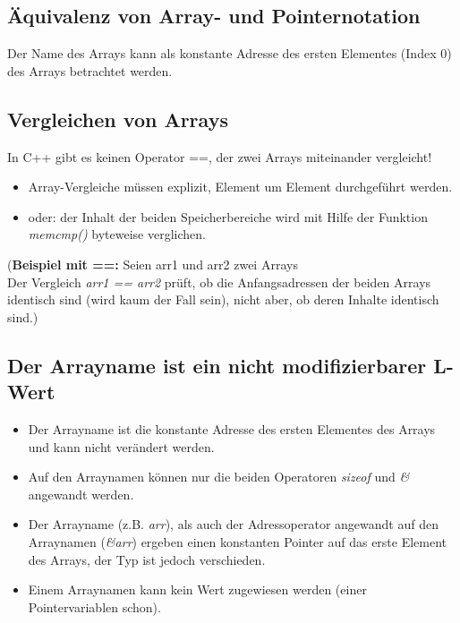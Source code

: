 \subsection{Äquivalenz von Array- und Pointernotation}
\begin{minipage}{0.3\linewidth}
Der Name des Arrays kann als konstante Adresse des ersten Elementes (Index 0) des Arrays betrachtet werden.
\end{minipage}%
\hspace{0.01\linewidth}
\begin{minipage}{0.65\linewidth}
	
\end{minipage}

\subsection{Vergleichen von Arrays}
\begin{hinweis}
In C++ gibt es keinen Operator ==, der zwei Arrays miteinander vergleicht!
\end{hinweis}
\begin{itemize}
	\item Array-Vergleiche müssen explizit, Element um Element durchgeführt werden.
	\item oder: der Inhalt der beiden Speicherbereiche wird mit Hilfe der Funktion \emph{memcmp()} byteweise verglichen.
\end{itemize}
\vspace{\baselineskip}
(\textbf{Beispiel mit ==:} Seien arr1 und arr2 zwei Arrays\\Der Vergleich \emph{arr1 == arr2} prüft, ob die Anfangsadressen der beiden Arrays identisch sind (wird kaum der Fall sein), nicht aber, ob deren Inhalte identisch sind.)
	
\subsection{Der Arrayname ist ein nicht modifizierbarer L-Wert}
\begin{itemize}
	\item Der Arrayname ist die konstante Adresse des ersten Elementes des Arrays und kann nicht verändert werden.
	\item Auf den Arraynamen können nur die beiden Operatoren \emph{sizeof} und \emph{\&} angewandt werden.
	\item Der Arrayname (z.B. \emph{arr}), als auch der Adressoperator angewandt auf den Arraynamen (\emph{\&arr}) ergeben einen konstanten Pointer auf das erste Element des Arrays, der Typ ist jedoch verschieden.
	\item Einem Arraynamen kann kein Wert zugewiesen werden (einer Pointervariablen schon).
\end{itemize}

